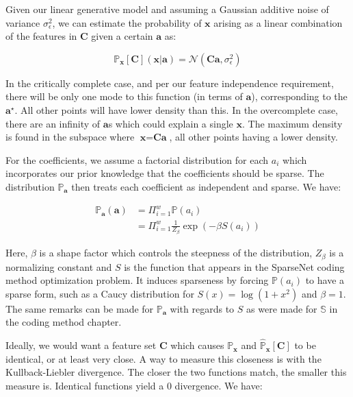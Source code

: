 \documentclass[12pt,a4paper,oneside,english]{UPBThesis}
\begin{document}
Given our linear generative model and assuming a Gaussian additive noise of variance $\sigma_\epsilon^2$, we can estimate the probability of $\textbf{x}$ arising as a linear combination of the features in $\textbf{C}$ given a certain $\textbf{a}$ as:

\begin{equation*}
\mathbb{P}_\textbf{x}[\textbf{C}](\textbf{x}\left|\right.\textbf{a}) = \mathcal{N}(\textbf{C}\textbf{a},\sigma_\epsilon^2)
\end{equation*}

In the critically complete case, and per our feature independence requirement, there will be only one mode to this function (in terms of $\textbf{a}$), corresponding to the $\textbf{a}^\star$. All other points will have lower density than this. In the overcomplete case, there are an infinity of $\textbf{a}$s which could explain a single $\textbf{x}$. The maximum density is found in the subspace where $\textbf{x} = \textbf{C}\textbf{a}$, all other points having a lower density.

For the coefficients, we assume a factorial distribution for each $a_i$ which incorporates our prior knowledge that the coefficients should be sparse. The distribution $\mathbb{P}_\textbf{a}$ then treats each coefficient as independent and sparse. We have:

\begin{align*}
\mathbb{P}_\textbf{a}(\textbf{a}) & = \Pi_{i=1}^{w}{\mathbb{P}(a_i)} \\
& = \Pi_{i=1}^{w} {\frac{1}{Z_\beta} \exp(-\beta S(a_i))}
\end{align*}

Here, $\beta$ is a shape factor which controls the steepness of the distribution, $Z_\beta$ is a normalizing constant and $S$ is the function that appears in the SparseNet coding method optimization problem. It induces sparseness by forcing $\mathbb{P}(a_i)$ to have a sparse form, such as a Caucy distribution for $S(x)=\log(1 + x^2)$ and $\beta=1$. The same remarks can be made for $\mathbb{P}_\textbf{a}$ with regards to $S$ as were made for $\mathbb{S}$ in the coding method chapter.

Ideally, we would want a feature set $\textbf{C}$ which causes $\mathbb{P}_\textbf{x}$ and $\hat{\mathbb{P}}_\textbf{x}[\textbf{C}]$ to be identical, or at least very close. A way to measure this closeness is with the Kullback-Liebler divergence. The closer the two functions match, the smaller this measure is. Identical functions yield a $0$ divergence. We have:
\end{document}
